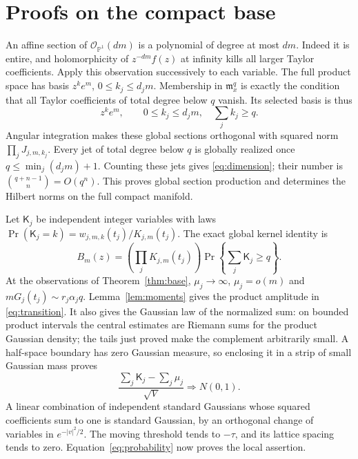 \documentclass[11pt]{article}
\theoremstyle{remark}\newtheorem{remark}[theorem]{Remark}
\newcommand{\CP}{\mathbb P}
\newcommand{\OO}{\mathcal O}
\newcommand{\mm}{\mathfrak m}
\begin{document}
\section{Proofs on the compact base}
An affine section of $\OO_{\CP^1}(dm)$ is a polynomial of degree at
most $dm$. Indeed it is entire, and holomorphicity of
$z^{-dm}f(z)$ at infinity kills all larger Taylor coefficients.
Apply this observation successively to each variable. The full product
space has basis $z^ke^m$, $0\leq k_j\leq d_jm$.
Membership in $\mm_x^q$ is exactly the condition that all Taylor
coefficients of total degree below $q$ vanish. Its selected basis is thus
\begin{equation}\label{eq:basis}
 z^ke^m,\qquad 0\leq k_j\leq d_jm,\quad \sum_jk_j\geq q.
\end{equation}
Angular integration makes these global sections orthogonal with squared
norm $\prod_jJ_{j,m,k_j}$. Every jet of total degree below $q$ is
globally realized once $q\leq\min_j(d_jm)+1$. Counting these jets gives
\eqref{eq:dimension}; their number is $\binom{q+n-1}{n}=O(q^n)$.
This proves global section production and determines the Hilbert norms
on the full compact manifold.

Let $\mathsf K_j$ be independent integer variables with laws
$\Pr(\mathsf K_j=k)=w_{j,m,k}(t_j)/K_{j,m}(t_j)$.
The exact global kernel identity is
\begin{equation}\label{eq:probability}
 B_m(z)=\left(\prod_jK_{j,m}(t_j)\right)
 \Pr\left\{\sum_j\mathsf K_j\geq q\right\}.
\end{equation}
At the observations of Theorem~\ref{thm:base},
$\mu_j\to\infty$, $\mu_j=o(m)$ and $mG_j(t_j)\sim r_j\alpha_jq$.
Lemma~\ref{lem:moments} gives the product amplitude in
\eqref{eq:transition}. It also gives the Gaussian law of the normalized
sum: on bounded product intervals the central estimates are Riemann
sums for the product Gaussian density; the tails just proved make the
complement arbitrarily small. A half-space boundary has zero Gaussian
measure, so enclosing it in a strip of small Gaussian mass proves
\[
 \frac{\sum_j\mathsf K_j-\sum_j\mu_j}{\sqrt V}
 \Longrightarrow N(0,1).
\]
A linear combination of independent standard Gaussians whose squared
coefficients sum to one is standard Gaussian, by an orthogonal change
of variables in $e^{-|v|^2/2}$. The moving threshold tends to $-\tau$,
and its lattice spacing tends to zero. Equation~\eqref{eq:probability}
now proves the local assertion.
\end{document}
